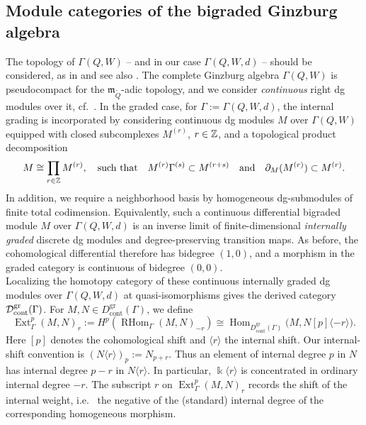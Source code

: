 \subsection{Module categories of the bigraded Ginzburg algebra}\label{ssec:module_categories_bigraded} The topology of $\Gamma(Q,W)$ -- and in our case $\Gamma(Q,W,d)$ -- should be considered, as in \cite[Appendix]{KellerYang} and see also \cite{Keller2026_GradedPreprint}. The complete Ginzburg algebra $\Gamma(Q,W)$ is pseudocompact for the $\mathfrak{m}_{\tilde{Q}}$-adic topology, and we consider {\it continuous} right dg modules over it, cf.~\cite[Appendix]{KellerYang}. In the graded case, for $\Gamma:=\Gamma(Q,W,d)$, the internal grading is incorporated by considering continuous dg modules $M$ over $\Gamma(Q,W)$ equipped with closed subcomplexes $M^{(r)}$, $r\in\mathbb Z$, and a topological product decomposition
\[
  M\cong\prod_{r\in\mathbb Z}M^{(r)},\quad\mbox{such that}\quad
  M^{(r)}\Gamma^{(s)}\subset M^{(r+s)}\quad\mbox{and}\quad
  \partial_M(M^{(r)})\subset M^{(r)}.
\]
In addition, we require a neighborhood basis by homogeneous dg-submodules of finite total codimension.  Equivalently, such a continuous differential bigraded module $M$ over $\Gamma(Q,W,d)$ is an inverse limit of finite-dimensional \emph{internally graded} discrete dg modules and degree-preserving transition maps. As before, the cohomological differential therefore has bidegree $(1,0)$, and a morphism in the graded category is continuous of bidegree $(0,0)$.\\

Localizing the homotopy category of these continuous internally graded dg modules over $\Gamma(Q,W,d)$ at quasi-isomorphisms gives the derived category $\mathcal D^{\mathrm{gr}}_{\mathrm{cont}}(\Gamma)$. For $M,N\in D^{\mathrm{gr}}_{\mathrm{cont}}(\Gamma)$, we define
\[
\operatorname{Ext}^p_\Gamma(M,N)_r
:=
H^p\!\left(
\operatorname{RHom}_\Gamma(M,N)_{-r}
\right)
\cong
\operatorname{Hom}_{D^{\mathrm{gr}}_{\mathrm{cont}}(\Gamma)}
\bigl(M,N[p]\langle-r\rangle\bigr).
\]
Here $[p]$ denotes the cohomological shift and $\langle r\rangle$
the internal shift. Our internal-shift convention is $(N\langle r\rangle)_p:=N_{p+r}$. Thus an element of internal degree $p$ in $N$ has internal degree
$p-r$ in $N\langle r\rangle$. In particular,
$\Bbbk\langle r\rangle$ is concentrated in ordinary internal degree
$-r$. The subscript $r$ on
$\operatorname{Ext}^p_\Gamma(M,N)_r$ records the shift of the internal
weight, i.e.~ the negative of the (standard) internal
degree of the corresponding homogeneous morphism.\\

